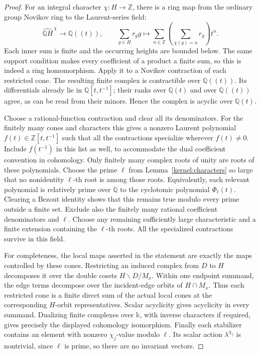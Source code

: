 \begin{proof}
For an integral character \(\chi:H\to\mathbb Z\), there is a ring map
from the ordinary group Novikov ring to the Laurent-series field:
\[
 \widehat{\mathbb QH}^{\,\chi}\longrightarrow\mathbb Q((t)),
 \qquad
 \sum_{g\in H}r_g g\longmapsto
        \sum_{n\in\mathbb Z}
          \left(\sum_{\chi(g)=n}r_g\right)t^n .
\]
Each inner sum is finite and the occurring heights are bounded below.
The same support condition makes every coefficient of a product a
finite sum, so this is indeed a ring homomorphism.  Apply it to a
Novikov contraction of each restricted cone.  The resulting finite
complex is contractible over \(\mathbb Q((t))\).  Its differentials
already lie in \(\mathbb Q[t,t^{-1}]\); their ranks over
\(\mathbb Q(t)\) and over \(\mathbb Q((t))\) agree, as can be read from
their minors.  Hence the complex is acyclic over \(\mathbb Q(t)\).

Choose a rational-function contraction and clear all its
denominators.  For the finitely many cones and characters this gives
a nonzero Laurent polynomial \(f(t)\in\mathbb Z[t,t^{-1}]\) such that
all the contractions specialize wherever \(f(t)\ne0\).  Include
\(f(t^{-1})\) in this list as well, to accommodate the dual coefficient
convention in cohomology.  Only finitely many complex roots of unity
are roots of these polynomials.  Choose the prime \(\ell\) from
Lemma~\ref{kernel:characters} so large that no nonidentity
\(\ell\)-th root is among those roots.  Equivalently, each relevant
polynomial is relatively prime over \(\mathbb Q\) to the cyclotomic
polynomial \(\Phi_\ell(t)\).  Clearing a Bezout identity shows that
this remains true modulo every prime outside a finite set.  Exclude
also the finitely many rational coefficient denominators and
\(\ell\).  Choose any remaining sufficiently large characteristic
and a finite extension containing the \(\ell\)-th roots.  All the
specialized contractions survive in this field.

For completeness, the local maps asserted in the statement are
exactly the maps controlled by these cones.  Restricting an induced
complex from \(D\) to \(H\) decomposes it over the double cosets
\(H\backslash D/M_x\).  Within one endpoint summand, the edge terms
decompose over the incident-edge orbits of \(H\cap M_x\).
Thus each restricted cone is a finite direct sum of the actual local
cones at the corresponding \(H\)-orbit representatives.  Scalar
acyclicity gives acyclicity in every summand.  Dualizing finite
complexes over \(\mathbb k\), with inverse characters if required,
gives precisely the displayed cohomology isomorphism.
Finally each stabilizer contains an element with nonzero
\(\chi_j\)-value modulo \(\ell\).  Its scalar action
\(\lambda^{\chi_j}\) is nontrivial, since \(\ell\) is prime, so there
are no invariant vectors.
\end{proof}

